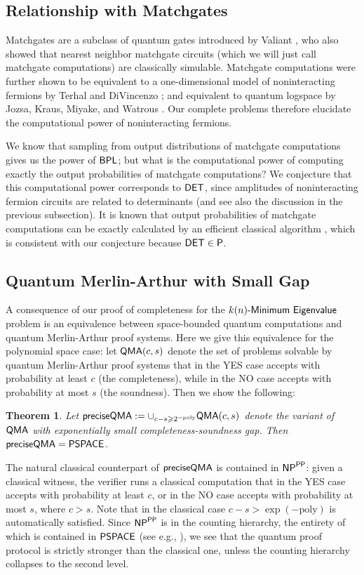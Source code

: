 \documentclass[11pt]{article}
\newcommand{\classfont}{\sf}
\newtheorem{theorem}[lemma]{Theorem}
\numberwithin{lemma}{section}
\theoremstyle{definition}
\newcommand\NP{\sf{NP}}
\newcommand\PP{\sf{PP}}
\newcommand\PSPACE{\sf{PSPACE}}
\newcommand\DET{{\sf{DET}}}
\newcommand\preciseQMA{{\sf{preciseQMA}}}
\newcommand\QMA{{\sf{QMA}}}
\newcommand{\BPL}{{\classfont{BPL}}}
\newcommand{\poly}{\mathrm{poly}}
\renewcommand{\ge}{\geqslant}
\newcommand\spechamiltonian[1]{#1\textit{\sf{-Minimum Eigenvalue}}}
\begin{document}
\subsection{Relationship with Matchgates}

Matchgates are a subclass of quantum gates introduced by Valiant \cite{Val02SIComp}, who also showed that nearest neighbor matchgate circuits (which we will just call matchgate computations) are classically simulable. Matchgate computations were further shown to be equivalent to a one-dimensional model of noninteracting fermions by Terhal and DiVincenzo \cite{TerDiV02PRA}; and equivalent to quantum logspace by Jozsa, Kraus, Miyake, and Watrous \cite{JozKraMiyWat10RSPA}. Our complete problems therefore elucidate the computational power of noninteracting fermions.

We know that sampling from output distributions of matchgate computations gives us the power of $\BPL$; but what is the computational power of computing exactly the output probabilities of matchgate computations? We conjecture that this computational power corresponds to $\DET$, since amplitudes of noninteracting fermion circuits are related to determinants (and see also the discussion in the previous subsection). It is known that output probabilities of matchgate computations can be exactly calculated by an efficient classical algorithm \cite{JozMiy08RSPA}, which is consistent with our conjecture because $\DET \in \classfont{P}$.

\subsection{Quantum Merlin-Arthur with Small Gap}
A consequence of our proof of completeness for the $\spechamiltonian{k(n)}$ problem is an equivalence between space-bounded quantum computations and quantum Merlin-Arthur proof systems. Here we give this equivalence for the polynomial space case: let $\QMA(c,s)$ denote the set of problems solvable by quantum Merlin-Arthur proof systems that in the YES case accepts with probability at least $c$ (the completeness), while in the NO case accepts with probability at most $s$ (the soundness). Then we show the following:
\begin{theorem} Let $\preciseQMA:= \cup_{c-s \ge 2^{-\poly}} \QMA(c,s)$ denote the variant of $\QMA$ with exponentially small completeness-soundness gap. Then
$\preciseQMA = \PSPACE$.
\end{theorem}

The natural classical counterpart of $\preciseQMA$ is contained in $\NP^{\PP}$: given a classical witness, the verifier runs a classical computation that in the YES case accepts with probability at least $c$, or in the NO case accepts with probability at most $s$, where $c>s$. Note that in the classical case $c - s > \exp(-\poly)$ is automatically satisfied. Since $\NP^{\PP}$ is in the counting hierarchy, the entirety of which is contained in $\PSPACE$ (see e.g., \cite{allenderwagner}), we see that the quantum proof protocol is strictly stronger than the classical one, unless the counting hierarchy collapses to the second level.
\end{document}
